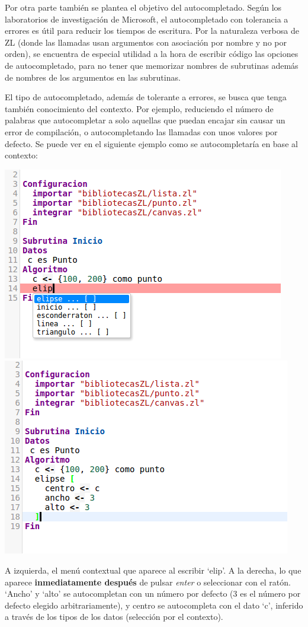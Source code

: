 \documentclass{report}
\begin{document}
	\vspace{10px}
	
	Por otra parte también se plantea el objetivo del autocompletado. Según los laboratorios de investigación de Microsoft, el autocompletado con tolerancia a errores es útil para reducir los tiempos de escritura\cite{microsoftresearchautocomplete}. Por la naturaleza verbosa de ZL (donde las llamadas usan argumentos con asociación por nombre y no por orden), se encuentra de especial utilidad a la hora de escribir código las opciones de autocompletado, para no tener que memorizar nombres de subrutinas además de nombres de los argumentos en las subrutinas. 

	\vspace{10px}

	El tipo de autocompletado, además de tolerante a errores, se busca que tenga también conocimiento del contexto. Por ejemplo, reduciendo el número de palabras que autocompletar a solo aquellas que puedan encajar sin causar un error de compilación, o autocompletando las llamadas con unos valores por defecto. Se puede ver en el siguiente ejemplo como se autocompletaría en base al contexto:
	
	\begin{center}
	\includegraphics[width=0.4\linewidth]{beforecompletion}
	\includegraphics[width=0.4\linewidth]{aftercompletion}
	
	A izquierda, el menú contextual que aparece al escribir `elip'. A la derecha, lo que aparece \textbf{inmediatamente después} de pulsar \textit{enter} o seleccionar con el ratón. `Ancho'  y `alto' se autocompletan con un número por defecto (3 es el número por defecto elegido arbitrariamente), y centro se autocompleta con el dato `c', inferido a través de los tipos de los datos (selección por el contexto).
	\end{center}
	
\end{document}
